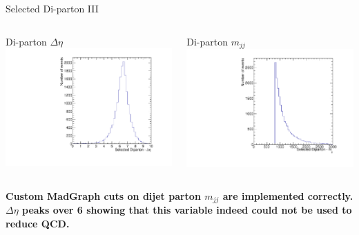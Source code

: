 \documentclass[8pt]{beamer}
\begin{document}
\begin{frame}{Selected Di-parton III}

\begin{columns}

  \centering

  \begin{block}{Di-parton $\Delta\eta$}
    \centering
    \includegraphics[width=0.8\linewidth]{img/SelDiParton_DEta.pdf}
  \end{block}
  
  \centering
 
  \begin{block}{Di-parton $m_{jj}$}
    \centering
    \includegraphics[width=0.8\linewidth]{img/SelDiParton_Mjj.pdf}
  \end{block}

\end{columns}

\begin{center}
\textbf{Custom MadGraph cuts on dijet parton $m_{jj}$ are implemented correctly. $\Delta\eta$ peaks over 6 showing that this variable indeed could not be used to reduce QCD.}
\end{center}

\end{frame}
\end{document}
